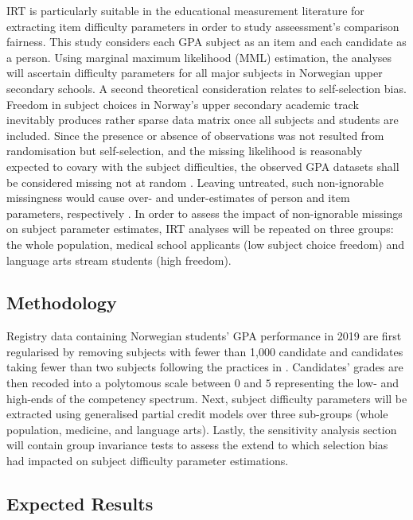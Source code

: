 IRT is particularly suitable in the educational measurement literature for extracting item difficulty parameters in order to study asseessment's comparison fairness. This study considers each GPA subject as an item and each candidate as a person. Using marginal maximum likelihood (MML) estimation, the analyses will ascertain difficulty parameters for all major subjects in Norwegian upper secondary schools. A second theoretical consideration relates to self-selection bias. Freedom in subject choices in Norway's upper secondary academic track inevitably produces rather sparse data matrix once all subjects and students are included. Since the presence or absence of observations was not resulted from randomisation but self-selection, and the missing likelihood is reasonably expected to covary with the subject difficulties, the observed GPA datasets shall be considered missing not at random \parencite[MNAR,][]{rubin:1976}. Leaving untreated, such non-ignorable missingness would cause over- and under-estimates of person and item parameters, respectively \parencite{rose:2013}. In order to assess the impact of non-ignorable missings on subject parameter estimates, IRT analyses will be repeated on three groups: the whole population, medical school applicants (low subject choice freedom) and language arts stream students (high freedom).

\subsection{Methodology}

Registry data containing Norwegian students' GPA performance in 2019 are first regularised by removing subjects with fewer than 1,000 candidate and candidates taking fewer than two subjects following the practices in \textcite{he:2018}. Candidates' grades are then recoded into a polytomous scale between $0$ and $5$ representing the low- and high-ends of the competency spectrum. Next, subject difficulty parameters will be extracted using generalised partial credit models \parencite[GPCM,][]{muraki:1992} over three sub-groups (whole population, medicine, and language arts). Lastly, the sensitivity analysis section will contain group invariance tests to assess the extend to which selection bias had impacted on subject difficulty parameter estimations.

\subsection{Expected Results}

